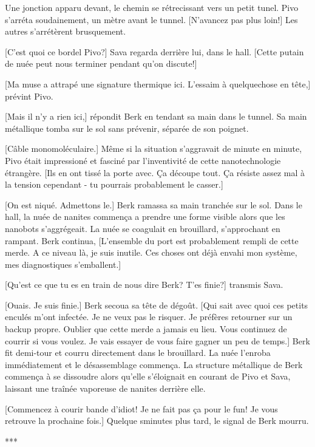 Une jonction apparu devant, le chemin se rétrecissant vers un petit tunel. Pivo s'arréta soudainement, un mètre avant le tunnel. [N'avancez pas plus loin!] Les autres s'arrétèrent brusquement. 

[C'est quoi ce bordel Pivo?] Sava regarda derrière lui, dans le hall. [Cette putain de nuée peut nous terminer pendant qu'on discute!] 

[Ma muse a attrapé une signature thermique ici. L'essaim à quelquechose en tête,] prévint Pivo. 

[Mais il n'y a rien ici,] répondit Berk en tendant sa main dans le tunnel. Sa main métallique tomba sur le sol sans prévenir, séparée de son poignet. 

[Câble monomoléculaire.] Même si la situation s'aggravait de minute en minute, Pivo était impressioné et fasciné par l'inventivité de cette nanotechnologie étrangère. [Ils en ont tissé la porte avec. Ça découpe tout. Ça résiste assez mal à la tension cependant - tu pourrais probablement le casser.] 

[On est niqué. Admettons le.] Berk ramassa sa main tranchée sur le sol. Dans le hall, la nuée de nanites commença a prendre une forme visible alors que les nanobots s'aggrégeait. La nuée se coagulait en brouillard, s'approchant en rampant. Berk continua, [L'ensemble du port est probablement rempli de cette merde. A ce niveau là, je suis inutile. Ces choses ont déjà envahi mon système, mes diagnostiques s'emballent.] 

[Qu'est ce que tu es en train de nous dire Berk? T'es finie?] transmis Sava. 

[Ouais. Je suis finie.] Berk secoua sa tête de dégoût. [Qui sait avec quoi ces petits enculés  m'ont infectée. Je ne veux pas le risquer. Je préfères retourner sur un backup propre. Oublier que cette merde a jamais eu lieu. Vous continuez de courrir si vous voulez. Je vais essayer de vous faire gagner un peu de temps.] Berk fit demi-tour et courru directement dans le brouillard. La nuée l'enroba immédiatement et le désassemblage commença. La structure métallique de Berk commença à se dissoudre alors qu'elle s'éloignait en courant de Pivo et Sava, laissant une traînée vaporeuse de nanites derrière elle. 

[Commencez à courir bande d'idiot! Je ne fait pas ça pour le fun! Je vous retrouve la prochaine fois.] Quelque sminutes plus tard, le signal de Berk mourru. 

\begin{center} *** \end{center} 

